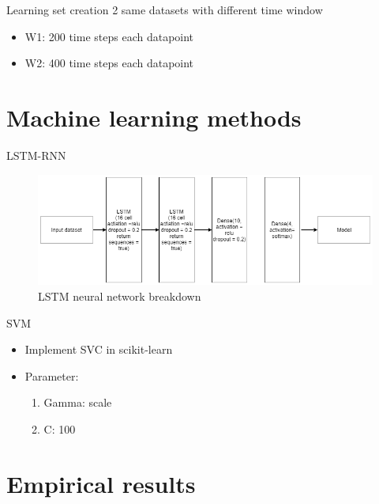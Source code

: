 \documentclass[xcolor=dvipsnames]{beamer} %
\begin{document}
	\begin{frame}{Learning set creation}
	    2 same datasets with different time window
	    \begin{itemize}
	        \item W1: 200 time steps each datapoint
	        \item W2: 400 time steps each datapoint
	    \end{itemize}
	\end{frame}
	
	\section{Machine learning methods}
	
	\begin{frame}{LSTM-RNN}
		\begin{figure}
		    \centering
		    \includegraphics[scale = 0.45]{images/LSTMDiagram.png}
		    \caption{LSTM neural network breakdown}
		    \label{fig:my_label}
		\end{figure}
	\end{frame}
	
	\begin{frame}{SVM}
		\begin{itemize}
		    \item Implement SVC in scikit-learn
		    \item Parameter:
		        \begin{enumerate}
		            \item Gamma: scale
		            \item C: 100
		        \end{enumerate}
		\end{itemize}
	\end{frame}
	
	\section{Empirical results}
	
\end{document}
